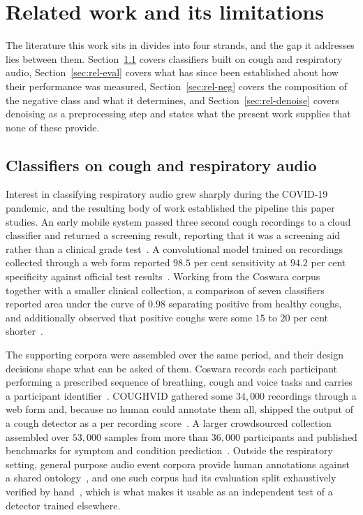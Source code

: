 \section{Related work and its limitations}\label{sec:related}

The literature this work sits in divides into four strands, and the gap it addresses lies
between them. Section~\ref{sec:rel-class} covers classifiers built on cough and
respiratory audio, Section~\ref{sec:rel-eval} covers what has since been established
about how their performance was measured, Section~\ref{sec:rel-neg} covers the
composition of the negative class and what it determines, and
Section~\ref{sec:rel-denoise} covers denoising as a preprocessing step and states what
the present work supplies that none of these provide.

\subsection{Classifiers on cough and respiratory audio}\label{sec:rel-class}

Interest in classifying respiratory audio grew sharply during the COVID-19 pandemic, and
the resulting body of work established the pipeline this paper studies. An early mobile
system passed three second cough recordings to a cloud classifier and returned a
screening result, reporting that it was a screening aid rather than a clinical grade
test~\cite{imran2020}. A convolutional model trained on recordings collected through a web
form reported $98.5$ per cent sensitivity at $94.2$ per cent specificity against official
test results~\cite{laguarta2020}. Working from the Coswara corpus together with a smaller
clinical collection, a comparison of seven classifiers reported area under the curve of
$0.98$ separating positive from healthy coughs, and additionally observed that positive
coughs were some $15$ to $20$ per cent shorter~\cite{pahar2021}.

The supporting corpora were assembled over the same period, and their design decisions
shape what can be asked of them. Coswara records each participant performing a prescribed
sequence of breathing, cough and voice tasks and carries a participant
identifier~\cite{coswara2020}. COUGHVID gathered some $34{,}000$ recordings through a web
form and, because no human could annotate them all, shipped the output of a cough
detector as a per recording score~\cite{coughvid2021}. A larger crowdsourced collection
assembled over $53{,}000$ samples from more than $36{,}000$ participants and published
benchmarks for symptom and condition prediction~\cite{xia2021}. Outside the respiratory
setting, general purpose audio event corpora provide human annotations against a shared
ontology~\cite{gemmeke2017}, and one such corpus had its evaluation split exhaustively
verified by hand~\cite{fsd50k2022}, which is what makes it usable as an independent test
of a detector trained elsewhere.

